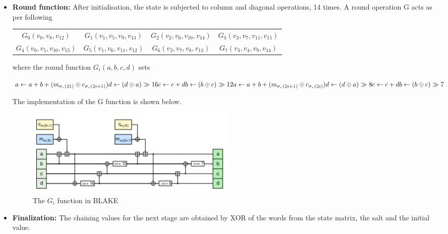 \documentclass[12pt]{artikel3}                  %
\begin{document}
\begin{itemize}
\item {\bf Round function:} After initialisation, the state is subjected to column and diagonal operations, 14
times. A round operation G acts as per following

\begin{table}
  \begin{center}
    \begin{tabular}{ *{4}{c}}
    $ G_{0}(v_{0}, v_{8}, v_{12})$ & $G_{1}(v_{1}, v_{5}, v_{9}, v_{13})$ & $G_{2}(v_{2}, v_{6}, v_{10}, v_{14})$ & $G_{3}(v_{3}, v_{7}, v_{11}, v_{15}) $\\
$G_{4}(v_{0}, v_{5}, v_{10}, v_{15})$ & $G_{5}(v_{1}, v_{6}, v_{11}, v_{12})$ & $G_{6}(v_{2}, v_{7}, v_{8}, v_{13})$ & $G_{7}(v_{3}, v_{4}, v_{9}, v_{14})$
    \end{tabular}
  \end{center}
\end{table}

where the round function $G_{i}(a, b, c, d)$ sets

$
a \gets a + b + (m_{\sigma_{r}(21)} \oplus c_{\sigma_{r}(2i + 1)}) \\
d \gets (d \oplus a) \gg 16 \\
c \gets c + d \\
b \gets (b \oplus c) \gg 12 \\
a \gets a + b + (m_{\sigma_{r}(2i + 1)} \oplus c_{\sigma_{r}(2i)}) \\
d \gets (d \oplus a) \gg 8 \\
c \gets c + d \\
b \gets (b \oplus c) \gg 7
$

The implementation of the G function is shown below.
\begin{figure}[h]
  \begin{center}
    \includegraphics[width=4in]{blakeGfunction.jpg}
  \end{center}
  \caption{The $G_{i}$ function in BLAKE}
  \label{fig:lab}
\end{figure}

\item {\bf Finalization:} The chaining values for the next stage are obtained by XOR of the words from the state 
matrix, the salt and the initial value.


\end{itemize}
\end{document}

